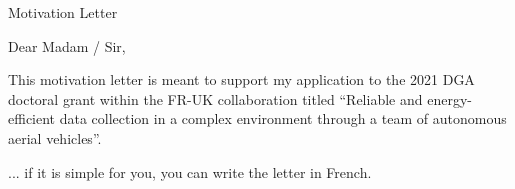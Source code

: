 \documentclass[a4paper,10pt]{article}
\begin{document}















\newpage

\normalsize{
    \begin{center}
        Motivation Letter
    \end{center}

    \vspace{0.5cm}
    \par Dear Madam / Sir,

    \vspace{0.5cm}

    \par This motivation letter is meant to support my application to the 2021 DGA doctoral grant within the FR-UK collaboration titled ``Reliable and energy-efficient data collection in a complex environment through a team of autonomous aerial vehicles''.

    \vspace{0.5cm}

    ... if it is simple for you, you can write the letter in French.




}
\end{document}
